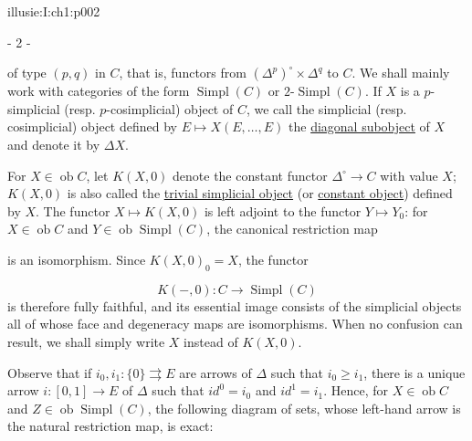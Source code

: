 \IllusieSetPhysicalPageSize{447bp}{698.6bp}
\begin{illusiebodypage}{illusie:I:ch1:p002}
\begin{center}- 2 -\end{center}
\vspace{8bp}\fontsize{9}{14}\selectfont

\hypertarget{illusie:I:ch1:s1:1:p2c1}{}%
\noindent of type $(p,q)$ in $C$, that is, functors from
$(\Delta^p)^{\circ}\times\Delta^q$ to $C$. We shall mainly work with categories
of the form $\operatorname{Simpl}(C)$ or $2\text{-}\operatorname{Simpl}(C)$.
If $X$ is a $p$-simplicial (resp. $p$-cosimplicial) object of $C$, we call the
simplicial (resp. cosimplicial) object defined by
$E\longmapsto X(E,\ldots,E)$ the \underline{diagonal subobject} of $X$ and
denote it by $\Delta X$.

\hypertarget{illusie:I:ch1:s1:1:p3}{}%
For $X\in\operatorname{ob}C$, let $K(X,0)$ denote the constant functor
$\Delta^{\circ}\longrightarrow C$ with value $X$; $K(X,0)$ is also called the
\underline{trivial simplicial object} (or \underline{constant object}) defined
by $X$. The functor $X\longmapsto K(X,0)$ is left adjoint to the functor
$Y\longmapsto Y_0$: for $X\in\operatorname{ob}C$ and
$Y\in\operatorname{ob}\operatorname{Simpl}(C)$, the canonical restriction map

\hypertarget{illusie:I:ch1:s1:1:eq2}{}%
\noindent{}\par

is an isomorphism. Since $K(X,0)_0=X$, the functor

\hypertarget{illusie:I:ch1:s1:1:d3}{}%
\[
  K(-,0):C\longrightarrow\operatorname{Simpl}(C)
\]
is therefore fully faithful, and its essential image consists of the
simplicial objects all of whose face and degeneracy maps are isomorphisms.
When no confusion can result, we shall simply write $X$ instead of $K(X,0)$.

\hypertarget{illusie:I:ch1:s1:1:p4}{}%
Observe that if $i_0,i_1:\{0\}\rightrightarrows E$ are arrows of $\Delta$ such
that $i_0\geq i_1$, there is a unique arrow $i:[0,1]\longrightarrow E$ of
$\Delta$ such that $i d^0=i_0$ and $i d^1=i_1$. Hence, for
$X\in\operatorname{ob}C$ and $Z\in\operatorname{ob}\operatorname{Simpl}(C)$,
the following diagram of sets, whose left-hand arrow is the natural
restriction map, is exact:


\end{illusiebodypage}
